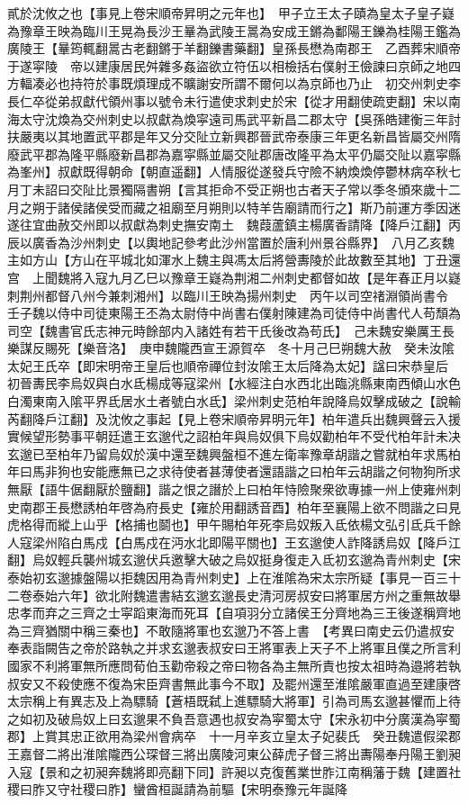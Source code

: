 貳於沈攸之也【事見上卷宋順帝昇明之元年也】　甲子立王太子賾為皇太子皇子嶷為豫章王映為臨川王晃為長沙王曅為武陵王暠為安成王鏘為鄱陽王鑠為桂陽王鑑為廣陵王【曅筠輒翻暠古老翻鏘于羊翻鑠書藥翻】皇孫長懋為南郡王　乙酉葬宋順帝于遂寜陵　帝以建康居民舛雜多姦盜欲立符伍以相檢括右僕射王儉諫曰京師之地四方輻凑必也持符於事既煩理成不曠謝安所謂不爾何以為京師也乃止　初交州刺史李長仁卒從弟叔獻代領州事以號令未行遣使求刺史於宋【從才用翻使疏吏翻】宋以南海太守沈煥為交州刺史以叔獻為煥寜遠司馬武平新昌二郡太守【吳孫皓建衡三年討扶嚴夷以其地置武平郡是年又分交阯立新興郡晉武帝泰康三年更名新昌皆屬交州隋廢武平郡為隆平縣廢新昌郡為嘉寜縣並屬交阯郡唐改隆平為太平仍屬交阯以嘉寜縣為峯州】叔獻既得朝命【朝直遥翻】人情服從遂發兵守險不納煥煥停鬱林病卒秋七月丁未詔曰交阯比景獨隔書朔【言其拒命不受正朔也古者天子常以季冬頒來歲十二月之朔于諸侯諸侯受而藏之祖廟至月朔則以特羊告廟請而行之】斯乃前運方季因迷遂往宜曲赦交州即以叔獻為刺史撫安南土　魏葭蘆鎮主楊廣香請降【降戶江翻】丙辰以廣香為沙州刺史【以輿地記參考此沙州當置於唐利州景谷縣界】　八月乙亥魏主如方山【方山在平城北如渾水上魏主與馮太后將營夀陵於此故數至其地】丁丑還宫　上聞魏將入寇九月乙巳以豫章王嶷為荆湘二州刺史都督如故【是年春正月以嶷刺荆州都督八州今兼刺湘州】以臨川王映為揚州刺史　丙午以司空禇淵領尚書令　壬子魏以侍中司徒東陽王丕為太尉侍中尚書右僕射陳建為司徒侍中尚書代人苟頹為司空【魏書官氏志神元時餘部内入諸姓有若干氏後改為苟氏】　己未魏安樂厲王長樂謀反賜死【樂音洛】　庚申魏隴西宣王源賀卒　冬十月己巳朔魏大赦　癸未汝隂太妃王氏卒【即宋明帝王皇后也順帝禪位封汝隂王太后降為太妃】諡曰宋恭皇后　初晉夀民李烏奴與白水氐楊成等寇梁州【水經注白水西北出臨洮縣東南西傾山水色白濁東南入隂平界氐居水土者號白水氐】梁州刺史范柏年說降烏奴擊成破之【說輸芮翻降戶江翻】及沈攸之事起【見上卷宋順帝昇明元年】柏年遣兵出魏興聲云入援實候望形勢事平朝廷遣王玄邈代之詔柏年與烏奴俱下烏奴勸柏年不受代柏年計未决玄邈已至柏年乃留烏奴於漢中還至魏興盤桓不進左衛率豫章胡諧之嘗就柏年求馬柏年曰馬非狗也安能應無已之求待使者甚薄使者還語諧之曰柏年云胡諧之何物狗所求無厭【語牛倨翻厭於鹽翻】諧之恨之譖於上曰柏年恃險聚衆欲專據一州上使雍州刺史南郡王長懋誘柏年啓為府長史【雍於用翻誘音酉】柏年至襄陽上欲不問諧之曰見虎格得而縱上山乎【格捕也鬬也】甲午賜柏年死李烏奴叛入氐依楊文弘引氐兵千餘人寇梁州陷白馬戍【白馬戍在沔水北即陽平關也】王玄邈使人詐降誘烏奴【降戶江翻】烏奴輕兵襲州城玄邈伏兵邀擊大破之烏奴挺身復走入氐初玄邈為青州刺史【宋泰始初玄邈據盤陽以拒魏因用為青州刺史】上在淮隂為宋太宗所疑【事見一百三十二卷泰始六年】欲北附魏遣書結玄邈玄邈長史清河房叔安曰將軍居方州之重無故舉忠孝而弃之三齊之士寜蹈東海而死耳【自項羽分立諸侯王分齊地為三王後遂稱齊地為三齊猶關中稱三秦也】不敢隨將軍也玄邈乃不答上書　【考異曰南史云仍遣叔安奉表詣闕告之帝於路執之并求玄邈表叔安曰王將軍表上天子不上將軍且僕之所言利國家不利將軍無所應問荀伯玉勸帝殺之帝曰物各為主無所責也按太祖時為邉將若執叔安又不殺使應不復為宋臣齊書無此事今不取】及罷州還至淮隂嚴軍直過至建康啓太宗稱上有異志及上為驃騎【蒼梧既弑上進驃騎大將軍】引為司馬玄邈甚懼而上待之如初及破烏奴上曰玄邈果不負吾意遇也叔安為寜蜀太守【宋永初中分廣漢為寜蜀郡】上賞其忠正欲用為梁州會病卒　十一月辛亥立皇太子妃裴氏　癸丑魏遣假梁郡王嘉督二將出淮隂隴西公琛督三將出廣陵河東公薛虎子督三將出夀陽奉丹陽王劉昶入寇【景和之初昶奔魏將即亮翻下同】許昶以克復舊業世胙江南稱藩于魏【建置社稷曰胙又守社稷曰胙】蠻酋桓誕請為前驅【宋明泰豫元年誕降